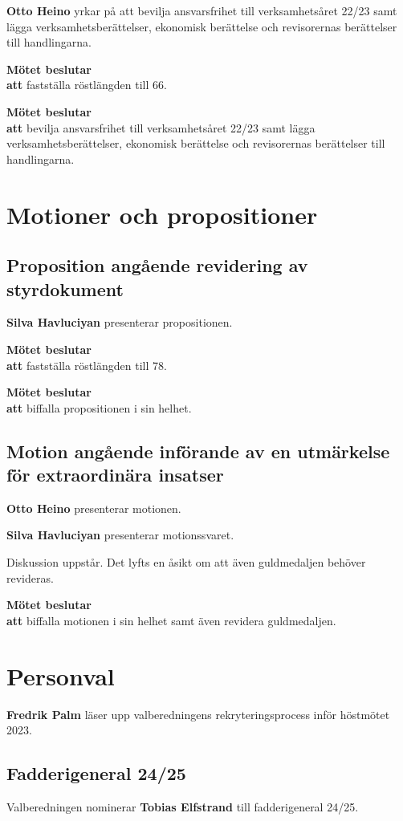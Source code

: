 \documentclass{datateknologsektionen-document}
\newcommand{\ind}{\hspace*{2em}}
\newcommand{\motetbeslutar}{\textbf{Mötet beslutar}}
\newcommand{\att}{\\\ind\textbf{att}}
\begin{document}
\textbf{Otto Heino} yrkar på att bevilja  ansvarsfrihet till verksamhetsåret 22/23 samt lägga verksamhetsberättelser, ekonomisk berättelse och revisorernas berättelser till handlingarna.

\motetbeslutar
\att{} fastställa röstlängden till 66.

\motetbeslutar
\att{} bevilja ansvarsfrihet till verksamhetsåret 22/23 samt lägga verksamhetsberättelser, ekonomisk berättelse och revisorernas berättelser till handlingarna.




\section{Motioner och propositioner}

\subsection{Proposition angående revidering av styrdokument}

\textbf{Silva Havluciyan} presenterar propositionen.

\motetbeslutar
\att{} fastställa röstlängden till 78.

\motetbeslutar
\att{} biffalla propositionen i sin helhet.

\subsection{Motion angående införande av en utmärkelse för
extraordinära insatser}

\textbf{Otto Heino} presenterar motionen.

\textbf{Silva Havluciyan} presenterar motionssvaret.

Diskussion uppstår. Det lyfts en åsikt om att även guldmedaljen behöver revideras.

\motetbeslutar
\att{} biffalla motionen i sin helhet samt även revidera guldmedaljen.


\pagebreak
\section{Personval}

\textbf{Fredrik Palm} läser upp valberedningens rekryteringsprocess inför höstmötet 2023.

\subsection{Fadderigeneral 24/25}
Valberedningen nominerar \textbf{Tobias Elfstrand} till fadderigeneral 24/25.
\end{document}
